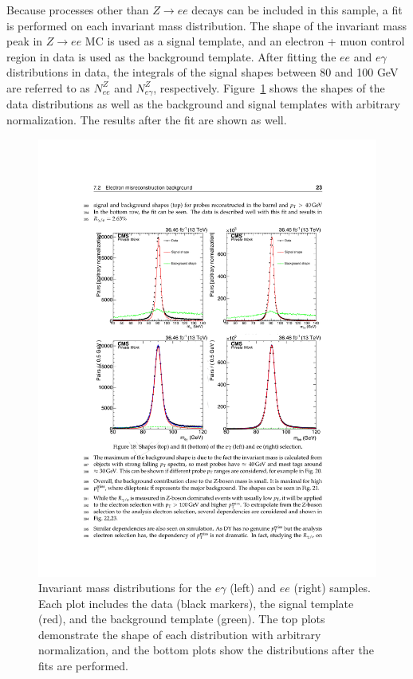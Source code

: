 Because processes other than $Z\rightarrow ee$ decays can be included in this sample, a fit is performed on each invariant mass distribution. The shape of the invariant mass peak in $Z\rightarrow ee$ MC is used as a signal template, and an electron + muon control region in data is used as the background template. After fitting the $ee$ and $e\gamma$ distributions in data, the integrals of the signal shapes between 80 and 100 GeV are referred to as $N_{ee}^Z$ and $N_{e\gamma}^Z$, respectively. 
Figure~\ref{fig:invMassShapes} shows the shapes of the data distributions as well as the background and signal templates with arbitrary normalization. The results after the fit are shown as well. 

\begin{figure}[h]
\begin{center}
\includegraphics[width=\textwidth]{Figures/DataAnalysis/EWKInvMassShapes.pdf}
\end{center}
\caption{Invariant mass distributions for the $e\gamma$ (left) and $ee$ (right) samples. Each plot includes the data (black markers), 
the signal template (red), and the background template (green). The top plots demonstrate the shape of each distribution with arbitrary 
normalization, and the bottom plots show the distributions after the fits are performed.
}
\label{fig:invMassShapes}
\end{figure}

